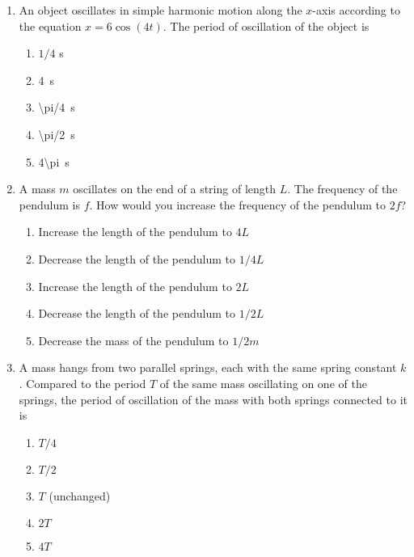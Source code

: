 \documentclass{../../oss-apphys}
\begin{document}
\begin{multicols}{2}
\begin{enumerate}[leftmargin=18pt]
    \columnbreak
    
  \item An object oscillates in simple harmonic motion along the $x$-axis
    according to the equation $x = 6 \cos(4t)$. The period of oscillation of the
    object is
    \begin{enumerate}[noitemsep,topsep=0pt]
    \item $1/4$ \si{s}
    \item\SI{4}{s}
    \item\SI{\pi/4}{s}
    \item\SI{\pi/2}{s}
    \item\SI{4\pi}{s}
    \end{enumerate}    

  \item A mass $m$ oscillates on the end of a string of length $L$. The
    frequency of the pendulum is $f$. How would you increase the frequency of
    the pendulum to $2f$?
    \begin{enumerate}[noitemsep,topsep=0pt]
    \item Increase the length of the pendulum to $4L$
    \item Decrease the length of the pendulum to $1/4L$
    \item Increase the length of the pendulum to $2L$
    \item Decrease the length of the pendulum to $1/2L$
    \item Decrease the mass of the pendulum to $1/2m$
    \end{enumerate}

  \item A mass hangs from two parallel springs, each with the same spring
    constant $k$. Compared to the period $T$ of the same mass oscillating on
    one of the springs, the period of oscillation of the mass with both
    springs connected to it is
    \begin{center}
    \end{center}
    \begin{enumerate}[noitemsep,topsep=0pt]
    \item $T/4$
    \item $T/2$
    \item $T$ (unchanged)
    \item $2T$
    \item $4T$
    \end{enumerate}


\end{enumerate}
\end{multicols}
\end{document}
